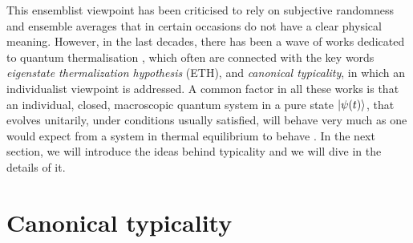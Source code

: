 \indent This ensemblist viewpoint has been criticised \cite{mccrea_1939, TERHAAR1995216, goldstein_gibbs_2020, goldstein_boltzmanns_2001} to rely on subjective randomness and ensemble averages that in certain occasions do not have a clear physical meaning. However, in the last decades, there has been a wave of works dedicated to quantum thermalisation \cite{popescu_foundations_2005, goldstein_canonical_2006, gemmer_thermalization_2006, popescu_entanglement_2006, goldstein_approach_2010, kaufman_quantum_2016, gogolin_equilibration_2016 }, which often are connected with the key words \textit{eigenstate thermalization hypothesis} (ETH), and \textit{canonical typicality}, in which an individualist viewpoint is addressed. A common factor in all these works is that an individual, closed, macroscopic quantum system in a pure state $\mathinner{|{\psi(t)}\rangle}$, that evolves unitarily, under conditions usually satisfied, will behave very much as one would expect from a system in thermal equilibrium to behave \cite{goldstein_gibbs_2020}. In the next section, we will introduce the ideas behind typicality and we will dive in the details of it.


\section{Canonical typicality}

